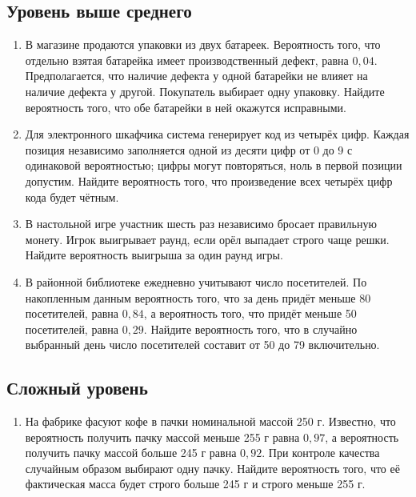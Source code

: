 \documentclass[a4paper,12pt]{article}
\begin{document}
\subsection*{Уровень выше среднего}
\begin{enumerate}[start=6]
\item В магазине продаются упаковки из двух батареек. Вероятность того, что отдельно взятая батарейка имеет производственный дефект, равна $0,04$. Предполагается, что наличие дефекта у одной батарейки не влияет на наличие дефекта у другой. Покупатель выбирает одну упаковку. Найдите вероятность того, что обе батарейки в ней окажутся исправными.
\item Для электронного шкафчика система генерирует код из четырёх цифр. Каждая позиция независимо заполняется одной из десяти цифр от 0 до 9 с одинаковой вероятностью; цифры могут повторяться, ноль в первой позиции допустим. Найдите вероятность того, что произведение всех четырёх цифр кода будет чётным.
\item В настольной игре участник шесть раз независимо бросает правильную монету. Игрок выигрывает раунд, если орёл выпадает строго чаще решки. Найдите вероятность выигрыша за один раунд игры.
\item В районной библиотеке ежедневно учитывают число посетителей. По накопленным данным вероятность того, что за день придёт меньше 80 посетителей, равна $0,84$, а вероятность того, что придёт меньше 50 посетителей, равна $0,29$. Найдите вероятность того, что в случайно выбранный день число посетителей составит от 50 до 79 включительно.
\end{enumerate}
\subsection*{Сложный уровень}
\begin{enumerate}[start=10]
\item На фабрике фасуют кофе в пачки номинальной массой 250 г. Известно, что вероятность получить пачку массой меньше 255 г равна $0,97$, а вероятность получить пачку массой больше 245 г равна $0,92$. При контроле качества случайным образом выбирают одну пачку. Найдите вероятность того, что её фактическая масса будет строго больше 245 г и строго меньше 255 г.
\end{enumerate}

\clearpage
\end{document}
